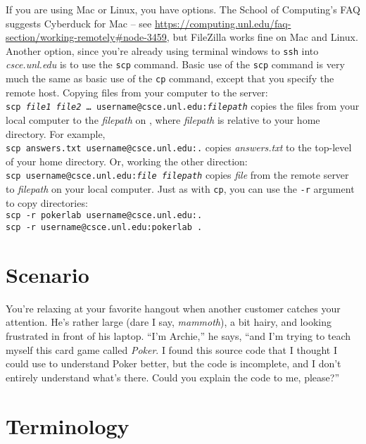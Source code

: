 If you are using Mac or Linux, you have options. The School of Computing's FAQ
suggests Cyberduck for Mac -- see
\url{https://computing.unl.edu/faq-section/working-remotely#node-3459}, but
FileZilla works fine on Mac and Linux. Another option, since you're already
using terminal windows to \texttt{ssh} into \textit{csce.unl.edu} is to use
the \texttt{scp} command. Basic use of the \texttt{scp} command is very much
the same as basic use of the \texttt{cp} command, except that you specify the
remote host. Copying files from your computer to the server: \\
\texttt{scp \textit{file1} \textit{file2} \dots
username@csce.unl.edu:\textit{filepath}} copies the files from your local
computer to the \textit{filepath} on \runtimeenvironment, where
\textit{filepath} is relative to your home directory. For example, \\
\texttt{scp answers.txt username@csce.unl.edu:.} copies \textit{answers.txt}
to the top-level of your home directory. Or, working the other direction: \\
\texttt{scp username@csce.unl.edu:\textit{file} \textit{filepath}} copies
\textit{file} from the remote server to \textit{filepath} on your local
computer. Just as with \texttt{cp}, you can use the \texttt{-r} argument to
copy directories: \\
\texttt{scp -r pokerlab username@csce.unl.edu:.} \\
\texttt{scp -r username@csce.unl.edu:pokerlab .}

\softwareengineeringfrontmatter

\section*{Scenario}

You're relaxing at your favorite hangout when another customer catches your
attention. He's rather large (dare I say, \textit{mammoth}), a bit hairy, and
looking frustrated in front of his laptop. ``I'm Archie,'' he says, ``and I'm
trying to teach myself this card game called \textit{Poker}. I found this
source code that I thought I could use to understand Poker better, but the code
is incomplete, and I don't entirely understand what's there. Could you explain
the code to me, please?''

\section{Terminology}

